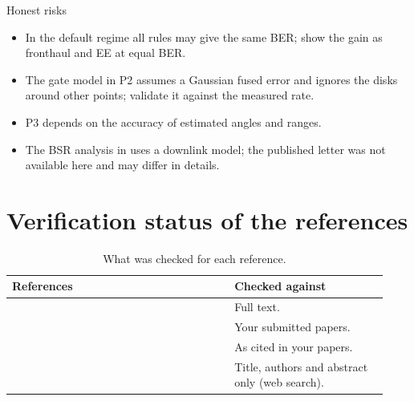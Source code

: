\documentclass[11pt]{article}
\begin{document}
\begin{warnbox}{Honest risks}
\begin{itemize}
  \item In the default regime all rules may give the same BER; show the gain as fronthaul and EE at equal BER.
  \item The gate model in P2 assumes a Gaussian fused error and ignores the disks around other points; validate it against the measured rate.
  \item P3 depends on the accuracy of estimated angles and ranges.
  \item The BSR analysis in \cite{mashdour2024study} uses a downlink model; the published letter \cite{mashdour2024wcl} was not available here and may differ in details.
\end{itemize}
\end{warnbox}

\section*{Verification status of the references}
\begin{table}[h]
\centering
\caption{What was checked for each reference.}
\label{tab:verify}
\begin{tabular}{@{}p{0.55\linewidth}p{0.38\linewidth}@{}}
\toprule
\textbf{References} & \textbf{Checked against}\\
\midrule
\cite{mashdour2024study,tesolin2026gbse,tesolin2026gbsa,lai2024hybridua,wang2026combining,chen2024nearfield} & Full text.\\
\cite{haider2026icassp,haider2026vtc} & Your submitted papers.\\
\cite{mashdour2024wcl,ssettumba2024iic,ssettumba2024idd,cui2022channel,bjornson2020scalable,demir2021foundations} & As cited in your papers.\\
\cite{buzzi2017uc,ngo2018ee,dao2020effective,ammar2022survey,gottsch2023fairness,gottsch2025fronthaul,ranasinghe2021gnn,pereira2025gnn,mylonopoulos2025los,jain1984fairness} & Title, authors and abstract only (web search).\\
\bottomrule
\end{tabular}
\end{table}
\end{document}
